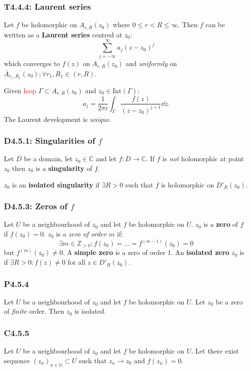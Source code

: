 \documentclass{article}
\begin{document}
\begin{multicols*}{3}
\subsubsection*{T4.4.4: Laurent series}
Let $f$ be holomorphic on $A_{r,R}(z_0)$ where $0\leq r<R\leq\infty$.
Then $f$ can be written as a \textbf{Laurent series} centred at $z_0$:
$$\sum_{j=-\infty}^{\infty}a_j(z-z_0)^j$$
which converges to $f(z)$ on $A_{r,R}(z_0)$ and \textit{uniformly}
on $\overline{A}_{r_1,R_1}(z_0);\forall r_1,R_1\in(r,R)$.

Given \textcolor{red}{loop} $\Gamma\subset A_{r,R}(z_0)$
and $z_0\in\text{Int}(\Gamma)$:
$$a_j=\frac{1}{2\pi i}\int_{\Gamma}\frac{f(z)}{(z-z_0)^{j+1}}\dd z.$$
The Laurent development is \textit{unique}.

\subsubsection*{D4.5.1: Singularities of $f$}
Let $D$ be a domain, let $z_0\in\mathbb{C}$ and let
$f:D\rightarrow\mathbb{C}$. If $f$ is \textit{not} holomorphic
at point $z_0$ then $z_0$ is a \textbf{singularity} of $f$.

$z_0$ is an \textbf{isolated singularity} if $\exists R>0$
such that $f$ is holomorphic on $D'_R(z_0)$.

\subsubsection*{D4.5.3: Zeros of $f$}
Let $U$ be a neighbourhood of $z_0$ and let $f$ be holomorphic on $U$.
$z_0$ is a \textbf{zero} of $f$ if $f(z_0)=0$.
$z_0$ is a \textit{zero of order $m$} if:
$$\exists m\in\mathbb{Z}_{>0}:f(z_0)=\dots=f^{(m-1)}(z_0)=0$$
but $f^{(m)}(z_0)\neq0$. A \textbf{simple zero} is a zero of order $1$.
An \textbf{isolated zero} $z_0$ is if $\exists R>0:f(z)\neq0$ for all
$z\in D'_R(z_0)$.

\subsubsection*{P4.5.4}
Let $U$ be a neighbourhood of $z_0$ and let $f$ be holomorphic
on $U$. Let $z_0$ be a zero of \textit{finite} order.
Then $z_0$ is isolated.

\subsubsection*{C4.5.5}
Let $U$ be a neighbourhood of $z_0$ and let $f$ be holomorphic
on $U$. Let there exist sequence $(z_n)_{n\in\mathbb{N}}\subset U$
such that $z_n\rightarrow z_0$ and $f(z_n)=0$. 


\end{multicols*}
\end{document}
